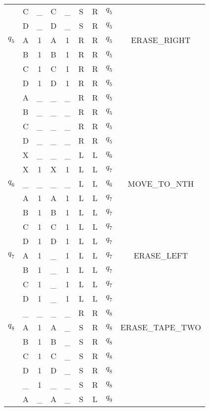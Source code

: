 \documentclass{report}
\begin{document}
\begin{appendix}
\begin{table}
\begin{tabular}{| c | c c | c c | c c | c | c |}
             & C & \_ & C & \_ & S & R & $q_5$ & \\
             & D & \_ & D & \_ & S & R & $q_5$ & \\
        \hline
        $q_5$ & A & 1 & A & 1 & R & R & $q_5$ & ERASE\_RIGHT \\
             & B & 1 & B & 1 & R & R & $q_5$ & \\
             & C & 1 & C & 1 & R & R & $q_5$ & \\
             & D & 1 & D & 1 & R & R & $q_5$ & \\
             & A & \_ & \_ & \_ & R & R & $q_5$ & \\
             & B & \_ & \_ & \_ & R & R & $q_5$ & \\
             & C & \_ & \_ & \_ & R & R & $q_5$ & \\
             & D & \_ & \_ & \_ & R & R & $q_5$ & \\
             & X & \_ & \_ & \_ & L & L & $q_6$ & \\
             & X & 1 & X & 1 & L & L & $q_7$ & \\
        \hline
        $q_6$ & \_ & \_ & \_ & \_ & L & L & $q_6$ & MOVE\_TO\_NTH \\
             & A & 1 & A & 1 & L & L & $q_7$ & \\
             & B & 1 & B & 1 & L & L & $q_7$ & \\
             & C & 1 & C & 1 & L & L & $q_7$ & \\
             & D & 1 & D & 1 & L & L & $q_7$ & \\
        \hline
        $q_7$ & A & 1 & \_ & 1 & L & L & $q_7$ & ERASE\_LEFT \\
             & B & 1 & \_ & 1 & L & L & $q_7$ & \\
             & C & 1 & \_ & 1 & L & L & $q_7$ & \\
             & D & 1 & \_ & 1 & L & L & $q_7$ & \\
             & \_ & \_ & \_ & \_ & R & R & $q_8$ & \\
        \hline
        $q_8$ & A & 1 & A & \_ & S & R & $q_8$ & ERASE\_TAPE\_TWO \\
             & B & 1 & B & \_ & S & R & $q_8$ & \\
             & C & 1 & C & \_ & S & R & $q_8$ & \\
             & D & 1 & D & \_ & S & R & $q_8$ & \\
             & \_ & 1 & \_ & \_ & S & R & $q_8$ & \\
             & A & \_ & A & \_ & S & L & $q_9$ & \\

\end{tabular}
\end{table}
\end{appendix}
\end{document}
